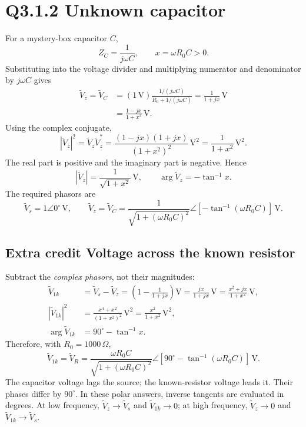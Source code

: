 \documentclass[11pt,letterpaper]{article}
\newcommand{\Vs}{\widetilde V_s}
\newcommand{\Vz}{\widetilde V_z}
\newcommand{\Vk}{\widetilde V_{1k}}
\begin{document}
\section*{Q3.1.2 Unknown capacitor}
For a mystery-box capacitor $C$,
\[
Z_C=\frac{1}{j\omega C},\qquad x=\omega R_0 C>0.
\]
Substituting into the voltage divider and multiplying numerator and
denominator by $j\omega C$ gives
\begin{align*}
\Vz=\widetilde V_C
&=(1\,\mathrm V)\frac{1/(j\omega C)}{R_0+1/(j\omega C)}
=\frac{1}{1+jx}\,\mathrm V\\
&=\frac{1-jx}{1+x^2}\,\mathrm V.
\end{align*}
Using the complex conjugate,
\[
|\Vz|^2=\Vz\Vz^*
=\frac{(1-jx)(1+jx)}{(1+x^2)^2}\,\mathrm V^2
=\frac{1}{1+x^2}\,\mathrm V^2.
\]
The real part is positive and the imaginary part is negative. Hence
\[
|\Vz|=\frac{1}{\sqrt{1+x^2}}\,\mathrm V,\qquad
\arg\Vz=-\tan^{-1}x.
\]
The required phasors are
\[
\boxed{\Vs=1\angle0^\circ\,\mathrm V},\qquad
\boxed{\Vz=\widetilde V_C=
\frac{1}{\sqrt{1+(\omega R_0 C)^2}}
\angle\!\left[-\tan^{-1}(\omega R_0 C)\right]\,\mathrm V}.
\]
\subsection*{Extra credit Voltage across the known resistor}
Subtract the \emph{complex phasors}, not their magnitudes:
\begin{align*}
\Vk&=\Vs-\Vz
=\left(1-\frac{1}{1+jx}\right)\mathrm V
=\frac{jx}{1+jx}\,\mathrm V
=\frac{x^2+jx}{1+x^2}\,\mathrm V,\\
|\Vk|^2&=\frac{x^4+x^2}{(1+x^2)^2}\,\mathrm V^2
=\frac{x^2}{1+x^2}\,\mathrm V^2,\\
\arg\Vk&=90^\circ-\tan^{-1}x.
\end{align*}
Therefore, with $R_0=1000\,\Omega$,
\[
\boxed{\Vk=\widetilde V_R=
\frac{\omega R_0 C}{\sqrt{1+(\omega R_0 C)^2}}
\angle\!\left[90^\circ-\tan^{-1}(\omega R_0 C)\right]\,\mathrm V}.
\]
The capacitor voltage lags the source; the known-resistor voltage leads it.
Their phases differ by $90^\circ$. In these polar answers, inverse tangents
are evaluated in degrees. At low frequency, $\Vz\to\Vs$ and $\Vk\to0$;
at high frequency, $\Vz\to0$ and $\Vk\to\Vs$.

\newpage
\end{document}
